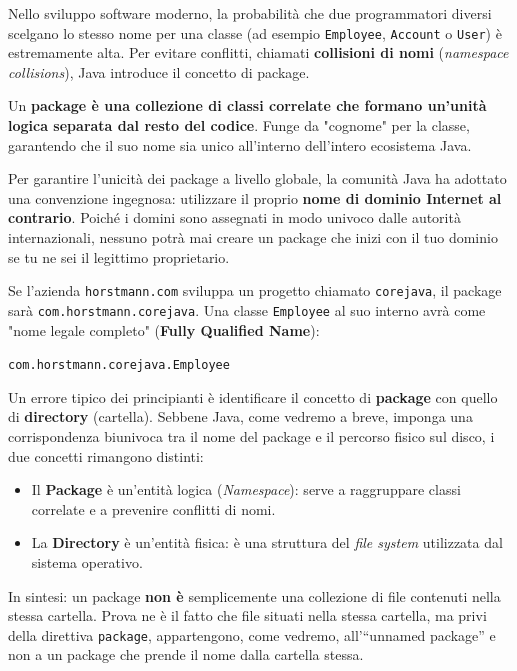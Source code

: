 Nello sviluppo software moderno, la probabilità che due programmatori diversi scelgano lo stesso nome per una classe (ad esempio \texttt{Employee}, \texttt{Account} o \texttt{User}) è estremamente alta. Per evitare conflitti, chiamati \textbf{collisioni di nomi} (\textit{namespace collisions}), Java introduce il concetto di package.

Un \textbf{package è una collezione di classi correlate che formano un'unità logica separata dal resto del codice}. Funge da "cognome" per la classe, garantendo che il suo nome sia unico all'interno dell'intero ecosistema Java.

Per garantire l'unicità dei package a livello globale, la comunità Java ha adottato una convenzione ingegnosa: utilizzare il proprio \textbf{nome di dominio Internet al contrario}.
Poiché i domini sono assegnati in modo univoco dalle autorità internazionali, nessuno potrà mai creare un package che inizi con il tuo dominio se tu ne sei il legittimo proprietario.

\begin{example}
    Se l'azienda \texttt{horstmann.com} sviluppa un progetto chiamato \texttt{corejava}, il package sarà \texttt{com.horstmann.corejava}. Una classe \texttt{Employee} al suo interno avrà come "nome legale completo" (\textbf{Fully Qualified Name}):
    \begin{center}
        \texttt{com.horstmann.corejava.Employee}
    \end{center}
\end{example}

\begin{warningbox}
Un errore tipico dei principianti è identificare il concetto di \textbf{package} con quello di \textbf{directory} (cartella). Sebbene Java, come vedremo a breve, imponga una corrispondenza biunivoca tra il nome del package e il percorso fisico sul disco, i due concetti rimangono distinti:
\begin{itemize}
    \item Il \textbf{Package} è un'entità logica (\textit{Namespace}): serve a raggruppare classi correlate e a prevenire conflitti di nomi.
    \item La \textbf{Directory} è un'entità fisica: è una struttura del \textit{file system} utilizzata dal sistema operativo.
\end{itemize}
In sintesi: un package \textbf{non è} semplicemente una collezione di file contenuti nella stessa cartella. Prova ne è il fatto che file situati nella stessa cartella, ma privi della direttiva \texttt{package}, appartengono, come vedremo, all'``unnamed package'' e non a un package che prende il nome dalla cartella stessa.
\end{warningbox}

